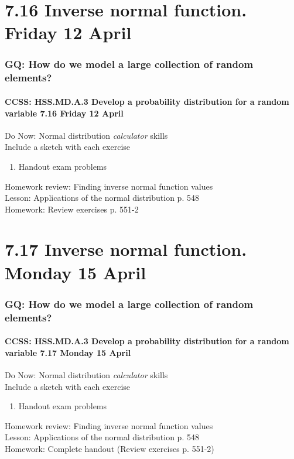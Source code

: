 \documentclass{beamer}
\begin{document}
\section{7.16 Inverse normal function. Friday 12 April}
  \frame
  {
    \frametitle{GQ: How do we model a large collection of random elements?}
    \framesubtitle{CCSS: HSS.MD.A.3 Develop a probability distribution for a random variable \hfill \alert{7.16 Friday 12 April}}

    \begin{block}{Do Now: Normal distribution \emph{calculator} skills\\Include a sketch with each exercise}
    \begin{enumerate}
      \item Handout exam problems
    \end{enumerate}
    \end{block}
    Homework review: Finding inverse normal function values\\
    Lesson: Applications of the normal distribution p. 548\\
    Homework: Review exercises p. 551-2
  }

\section{7.17 Inverse normal function. Monday 15 April}
  \frame
  {
    \frametitle{GQ: How do we model a large collection of random elements?}
    \framesubtitle{CCSS: HSS.MD.A.3 Develop a probability distribution for a random variable \hfill \alert{7.17 Monday 15 April}}

    \begin{block}{Do Now: Normal distribution \emph{calculator} skills\\Include a sketch with each exercise}
    \begin{enumerate}
      \item Handout exam problems
    \end{enumerate}
    \end{block}
    Homework review: Finding inverse normal function values\\
    Lesson: Applications of the normal distribution p. 548\\
    Homework: Complete handout (Review exercises p. 551-2)
  }
\end{document}
